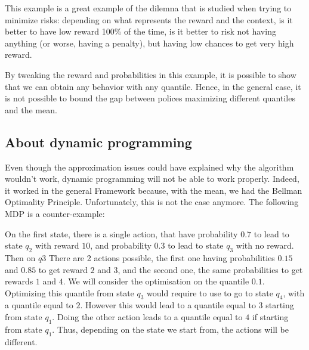 This example is a great example of the dilemna that is studied when trying to minimize risks: depending on what represents the reward and the context, is it better to have low reward 100\% of the time, is it better to risk not having anything (or worse, having a penalty), but having low chances to get very high reward.

By tweaking the reward and probabilities in this example, it is possible to show that we can obtain any behavior with any quantile. Hence, in the general case, it is not possible to bound the gap between polices maximizing different quantiles and the mean.

\subsection{About dynamic programming}

Even though the approximation issues could have explained why the algorithm wouldn’t work, dynamic programming will not be able to work properly. Indeed, it worked in the general Framework because, with the mean, we had the Bellman Optimality Principle. Unfortunately, this is not the case anymore. The following MDP is a counter-example:

    \begin{center}
    \end{center}

On the first state, there is a single action, that have probability $0.7$ to lead to state $q_2$ with reward $10$, and probability $0.3$ to lead to state $q_3$ with no reward. Then on $q3$ There are 2 actions possible, the first one having probabilities $0.15$ and $0.85$ to get reward $2$ and $3$, and the second one, the same probabilities to get rewards $1$ and $4$. We will consider the optimisation on the quantile $0.1$. Optimizing this quantile from state $q_3$ would require to use to go to state $q_4$, with a quantile equal to $2$. However this would lead to a quantile equal to $3$ starting from state $q_1$. Doing the other action leads to a quantile equal to $4$ if starting from state $q_1$. Thus, depending on the state we start from, the actions will be different.\\

